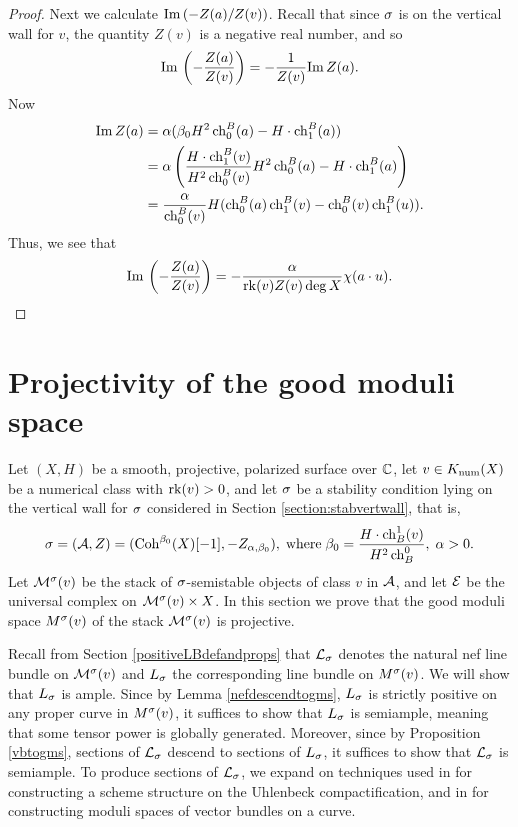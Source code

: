 \documentclass[letterpaper,12pt]{amsart}
\theoremstyle{remark}
\begin{document}
\begin{proof}
    Next we calculate $\mathrm{Im}\,(-Z(a)/Z(v))$. Recall that since $\sigma$ is on the vertical wall for $v$, the quantity $Z(v)$ is a negative real number, and so 
    \[ \mathrm{Im}\,\left(-\frac{Z(a)}{Z(v)}\right) = -\frac{1}{Z(v)} \mathrm{Im}\, Z(a). \]
    Now 
    \begin{align*}
        \mathrm{Im}\, Z(a) & = \alpha(\beta_0 H^2 \operatorname{\mathrm{ch}}^B_0(a) - H \cdot \operatorname{\mathrm{ch}}^B_1(a)) \\
        & = \alpha \left( \frac{H \cdot \operatorname{\mathrm{ch}}^B_1(v)}{H^2 \operatorname{\mathrm{ch}}^B_0(v)} H^2 \operatorname{\mathrm{ch}}^B_0(a) - H \cdot \operatorname{\mathrm{ch}}^B_1(a) \right) \\
        & = \frac{\alpha}{\operatorname{\mathrm{ch}}^B_0(v)} H (\operatorname{\mathrm{ch}}^B_0(a) \operatorname{\mathrm{ch}}^B_1(v) - \operatorname{\mathrm{ch}}^B_0(v) \operatorname{\mathrm{ch}}^B_1(u)).
    \end{align*}
    Thus, we see that
    \[ \mathrm{Im}\,\left(-\frac{Z(a)}{Z(v)}\right) = -\frac{\alpha}{\operatorname{\mathrm{rk}}(v) Z(v) \deg X} \chi(a \cdot u). \]
\end{proof}


\section{Projectivity of the good moduli space}

Let $(X, H)$ be a smooth, projective, polarized surface over $\mathbb{C}$, let $v \in K_{\mathrm{num}}(X)$ be a numerical class with $\operatorname{\mathrm{rk}}(v) > 0$, and let $\sigma$ be a stability condition lying on the vertical wall for $\sigma$ considered in Section \ref{section:stabvertwall}, that is,
\[ \sigma = (\mathcal{A}, Z) = (\mathrm{Coh}^{\beta_0}(X)[-1], -Z_{\alpha, \beta_0}), \; \mathrm{where} \; \beta_0 = \frac{H \cdot \operatorname{\mathrm{ch}}_B^1(v)}{H^2 \operatorname{\mathrm{ch}}_B^0}, \; \alpha > 0. \]
Let $\mathcal{M}^\sigma(v)$ be the stack of $\sigma$-semistable objects of class $v$ in $\mathcal{A}$, and let $\mathcal{E}$ be the universal complex on $\mathcal{M}^\sigma(v) \times X$. In this section we prove that the good moduli space $M^\sigma(v)$ of the stack $\mathcal{M}^\sigma(v)$ is projective. 

Recall from Section \ref{positiveLBdefandprops} that $\mathcal{L}_\sigma$ denotes the natural nef line bundle on $\mathcal{M}^\sigma(v)$ and $L_\sigma$ the corresponding line bundle on $M^\sigma(v)$. We will show that $L_\sigma$ is ample. Since by Lemma \ref{nefdescendtogms}, $L_\sigma$ is strictly positive on any proper curve in $M^\sigma(v)$, it suffices to show that $L_\sigma$ is semiample, meaning that some tensor power is globally generated. Moreover, since by Proposition \ref{vbtogms}, sections of $\mathcal{L}_\sigma$ descend to sections of $L_\sigma$, it suffices to show that $\mathcal{L}_\sigma$ is semiample. To produce sections of $\mathcal{L}_\sigma$, we expand on techniques used in \cite{li} for constructing a scheme structure on the Uhlenbeck compactification, and in \cite{seshadri} for constructing moduli spaces of vector bundles on a curve. 
\end{document}
